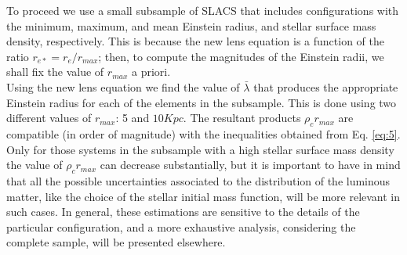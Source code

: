 \documentclass[letterpaper,10pt]{article}
\begin{document}
\begin{multicols}{2}
{To proceed we use a small subsample of SLACS that includes configurations with the minimum, maximum, and mean Einstein radius, and stellar surface mass density, respectively. This is because the new lens equation is a function of the ratio $r_{e \ast} = r_e/r_{max}$; then, to compute the magnitudes of the Einstein radii, we shall fix the value of $r_{max}$ a priori.\\
Using the new lens equation we find the value of $\bar{\lambda}$ that produces the appropriate Einstein radius for each of the elements in the subsample. This is done using two different values of $r_{max}$: 5 and $10 Kpc$. The resultant products $\rho_{c}r_{max}$ are compatible (in order of magnitude) with the inequalities obtained from Eq. \eqref{eq:5}. Only for those systems in the subsample with a high stellar surface mass density the value of $\rho_{c}r_{max}$ can decrease substantially, but it is important to have in mind that all the possible uncertainties associated to the distribution of the luminous matter, like the choice of the stellar initial mass function, will be more relevant in such cases. In general, these estimations are sensitive to the details of the particular configuration, and a more exhaustive analysis, considering the complete sample, will be presented elsewhere.
\\\\\\}
\end{multicols}
\end{document}
